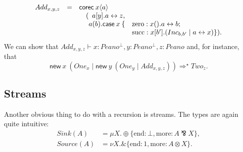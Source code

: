 \documentclass[orivec,envcountsame]{llncs}
\newcommand{\with}{\mathbin\binampersand}
\newcommand{\parr}{\mathbin\bindnasrepma}
\newcommand{\cpdual}[1]{#1^\perp}
\newcommand{\cptyp}[2]{#1 \vdash #2}
\newcommand{\mkwd}[1]{\mathsf{#1}}
\newcommand{\link}[2]{#1 \leftrightarrow #2}
\newcommand{\cut}[4]{\mkwd{new}\:#1 \: (#3 \mid #4)}
\newcommand{\clabel}[1]{\mathrm{#1}}
\begin{document}
{\small\[\begin{array}{rcl@{\hspace{0mm}}ll}
  Add_{x,y,z} & = & \mcl{3}{\mkwd{corec}\:x\langle a \rangle} \\
  & & \quad (&\mcl{2}{a[y].\link{a}{z},} \\
  & & & a(b).\mkwd{case}\:x\:\{&\clabel{zero}: x().\link{a}{b}; \\
  & & & & \clabel{succ}: x[b'].(Inc_{b,b'} \mid  \link{a}{x}) \}).
\end{array}\]}
We can show that $\cptyp{Add_{x,y,z}}{x:\cpdual{Peano}, y:\cpdual{Peano}, z:Peano}$ and, for instance,
that
%
{\small\[
  \cut{x}{Peano}{One_x}{\cut{y}{Peano}{One_y}{Add_{x,y,z}}} \Longrightarrow^\star Two_z.
\]}

\subsection{Streams}

Another obvious thing to do with a recursion is streams.  The types are again quite intuitive:
{\small\begin{align*}
  Sink(A) &= \mu X. \oplus \{ \clabel{end}: \bot, \clabel{more}: A \parr X \}, \\
  Source(A) &= \nu X. \with \{ \clabel{end}: 1, \clabel{more}: A \otimes X \}.
\end{align*}}
\end{document}
